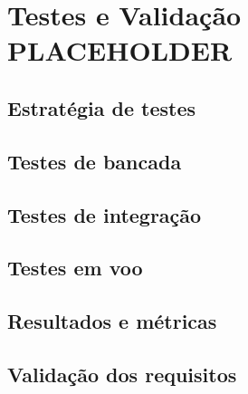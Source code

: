 \section{Testes e Validação PLACEHOLDER}
\subsection{Estratégia de testes}
\subsection{Testes de bancada}
\subsection{Testes de integração}
\subsection{Testes em voo}
\subsection{Resultados e métricas}
\subsection{Validação dos requisitos}